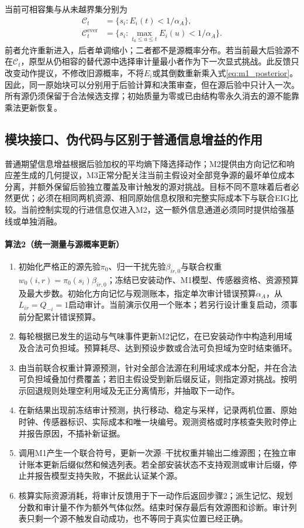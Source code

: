 当前可相容集与从未越界集分别为
\begin{equation}
\begin{aligned}
\mathcal C_t&=\{s_i:E_i(t)<1/\alpha_A\},\\
\mathcal C_t^{\mathrm{ever}}&=
\{s_i:\max_{t_0\le u\le t}E_i(u)<1/\alpha_A\}.
\end{aligned}
\label{eq:m3_lists}
\end{equation}
前者允许重新进入，后者单调缩小；二者都不是源概率分布。若当前最大后验源不在$\mathcal C_t$，原型从仍相容的替代源中选择审计量最小者作为下一次显式挑战。此反馈只改变动作提议，不修改旧源概率，不将$E_i$或其倒数重新乘入式\eqref{eq:m1_posterior}。因此，同一原始块可以分别用于后验计算和决策审查，但在源后验中只计入一次。所有源仍须保留于合法候选支撑；初始质量为零或已由结构零永久消去的源不能靠乘法更新恢复。

\subsection{模块接口、伪代码与区别于普通信息增益的作用}

普通期望信息增益根据后验加权的平均熵下降选择动作；M2提供由方向记忆和响应差生成的几何提议，M3正常分配关注当前主假设对全部竞争源的最坏单位成本分离，并额外保留后验独立覆盖及审计触发的源对挑战。目标不同不意味着后者必然更优；必须在相同两机资源、相同原始信息权限和完整实际成本下与联合EIG比较。当前控制实现的行进信息仅进入M2，这一额外信息通道必须同时提供给强基线或单独消融。

\paragraph{算法2（统一测量与源概率更新）}
\begin{enumerate}
\item 初始化严格正的源先验$\pi_0$、归一干扰先验$\beta_{ir,0}$与联合权重$w_0(i,r)=\pi_0(s_i)\beta_{ir,0}$；冻结已安装动作、M1模型、传感器资格、资源预算及最大步数。初始化方向记忆与观测账本，指定单次审计错误预算$\alpha_A$，从$L_{ir}=Q_{-i}=1$启动审计。当前演示仅用一个账本；若另行设计重复启动，须事前分配累计错误预算。
\item 每轮根据已发生的运动与气味事件更新M2记忆，在已安装动作中构造利用域及合法可负担域。预算耗尽、达到预设步数或合法可负担域为空时结束循环。
\item 由当前联合权重计算源预测，针对全部合法源在利用域求成本分配，并在合法可负担域叠加付费覆盖；若旧主假设受到新后缀反证，则指定源对挑战。按明示回退规则处理空利用域及无正分离情形，并抽取下一动作。
\item 在新结果出现前冻结审计预测，执行移动、稳定与采样，记录两机位置、原始时钟、传感器标识、实际成本和唯一块编号。观测资格或时序核查失败时停止并报告原因，不插补新证据。
\item 调用M1产生一个联合符号，更新一次源--干扰权重并输出二维源图；在独立审计账本更新后缀似然和候选列表。若全部安装状态不支持观测或审计后缀，停止并报告模型支持失败，不据此认证某个源。
\item 核算实际资源消耗，将审计反馈用于下一动作后返回步骤2；派生记忆、规划分数和审计量不作为额外气体似然。结束时保存最后有效源图和诊断。审计列表只剩一个源不触发自动成功，也不等同于真实位置已经正确。
\end{enumerate}


